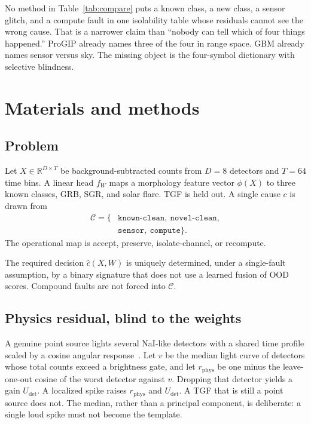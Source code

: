 \documentclass[preprint,12pt]{elsarticle}
\begin{document}
No method in Table~\ref{tab:compare} puts a known class, a new class, a sensor glitch, and a compute fault in one isolability table whose residuals cannot see the wrong cause. That is a narrower claim than ``nobody can tell which of four things happened.'' ProGIP already names three of the four in range space. GBM already names sensor versus sky. The missing object is the four-symbol dictionary with selective blindness.

\section{Materials and methods}

\subsection{Problem}

Let $X\in\mathbb{R}^{D\times T}$ be background-subtracted counts from $D=8$ detectors and $T=64$ time bins. A linear head $f_W$ maps a morphology feature vector $\phi(X)$ to three known classes, GRB, SGR, and solar flare. TGF is held out. A single cause $c$ is drawn from
\begin{align*}
\mathcal{C}=\{&\texttt{known-clean},\ \texttt{novel-clean},\\
&\texttt{sensor},\ \texttt{compute}\}.
\end{align*}
The operational map is accept, preserve, isolate-channel, or recompute.

The required decision $\hat{c}(X,W)$ is uniquely determined, under a single-fault assumption, by a binary signature that does not use a learned fusion of OOD scores. Compound faults are not forced into $\mathcal{C}$.

\subsection{Physics residual, blind to the weights}

A genuine point source lights several NaI-like detectors with a shared time profile scaled by a cosine angular response~\cite{meegan2009}. Let $v$ be the median light curve of detectors whose total counts exceed a brightness gate, and let $r_{\mathrm{phys}}$ be one minus the leave-one-out cosine of the worst detector against $v$. Dropping that detector yields a gain $U_{\mathrm{det}}$. A localized spike raises $r_{\mathrm{phys}}$ and $U_{\mathrm{det}}$. A TGF that is still a point source does not. The median, rather than a principal component, is deliberate: a single loud spike must not become the template.
\end{document}
